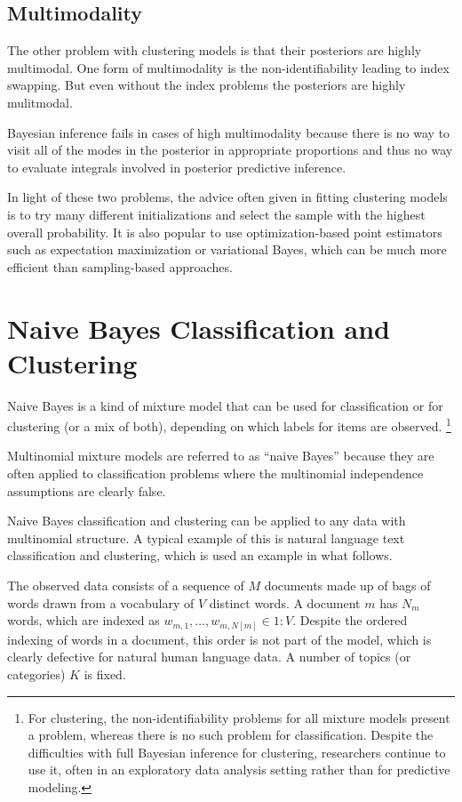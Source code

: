 \subsection{Multimodality}

The other problem with clustering models is that their posteriors are
highly multimodal.  One form of multimodality is the
non-identifiability leading to index swapping.  But even without
the index problems the posteriors are highly mulitmodal.

Bayesian inference fails in cases of high multimodality because there
is no way to visit all of the modes in the posterior in appropriate
proportions and thus no way to evaluate integrals involved in
posterior predictive inference.

In light of these two problems, the advice often given in fitting
clustering models is to try many different initializations and select
the sample with the highest overall probability.  It is also popular
to use optimization-based point estimators such as expectation
maximization or variational Bayes, which can be much more efficient
than sampling-based approaches.


\section{Naive Bayes Classification and Clustering}

Naive Bayes is a kind of mixture model that can be used for
classification or for clustering (or a mix of both), depending on
which labels for items are observed.%
%
\footnote{For clustering, the non-identifiability problems for all
  mixture models present a problem, whereas there is no such problem
  for classification.  Despite the difficulties with full Bayesian
  inference for clustering, researchers continue to use it, often in
  an exploratory data analysis setting rather than for predictive
  modeling.}

Multinomial mixture models are referred to as ``naive Bayes'' because
they are often applied to classification problems where the
multinomial independence assumptions are clearly false. 

Naive Bayes classification and clustering can be applied to any data
with multinomial structure.  A typical example of this is natural
language text classification and clustering, which is used an example
in what follows. 

The observed data consists of a sequence of $M$ documents made up of
bags of words drawn from a vocabulary of $V$ distinct words.  A
document $m$ has $N_m$ words, which are indexed as $w_{m,1}, \ldots,
w_{m,N[m]} \in 1{:}V$.  Despite the ordered indexing of words in a
document, this order is not part of the model, which is clearly
defective for natural human language data.  A number of topics (or
categories) $K$ is fixed.

